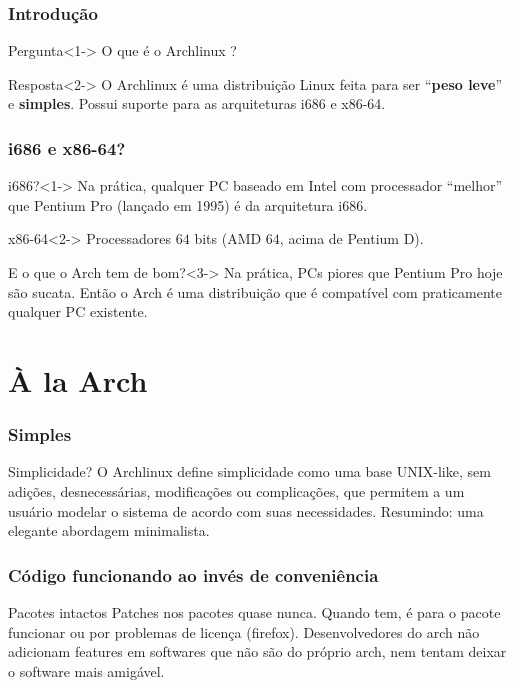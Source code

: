 \documentclass{beamer}
\begin{document}

\begin{frame}
    \frametitle{Introdução}
    \begin{block}{Pergunta}<1->
        O que é o Archlinux ?
    \end{block}
    \begin{block}{Resposta}<2->
            O Archlinux é uma distribuição Linux feita para ser ``\textbf{peso leve}'' e \textbf{simples}. Possui suporte para as arquiteturas i686 e x86-64. 
    \end{block}
    
\end{frame}

\begin{frame}
    \frametitle{i686 e x86-64?}
    \begin{block}{i686?}<1->
        Na prática, qualquer PC baseado em Intel com processador ``melhor'' que Pentium Pro (lançado em 1995) é da arquitetura i686. 
    \end{block}
    \begin{block}{x86-64}<2->
        Processadores $64$ bits (AMD $64$, acima de Pentium D). 
    \end{block}
    \begin{block}{E o que o Arch tem de bom?}<3->
        Na prática, PCs piores que Pentium Pro hoje são sucata. Então o Arch é uma distribuição que é compatível com praticamente qualquer PC existente.
    \end{block}

\end{frame}

\section{À la Arch}

\begin{frame}
    \frametitle{Simples}
    \begin{block}{Simplicidade?}
        O Archlinux define simplicidade como uma base UNIX-like, sem adições,
        desnecessárias, modificações ou complicações, que permitem a um usuário modelar o sistema de acordo com suas 
        necessidades. Resumindo: uma elegante abordagem minimalista.
    \end{block}
\end{frame}


\begin{frame}
    \frametitle{Código funcionando ao invés de conveniência} 
    \begin{block}{Pacotes intactos}
        Patches nos pacotes quase nunca. Quando tem, é para o pacote funcionar ou por problemas de licença (firefox). Desenvolvedores do 
        arch não adicionam features em softwares que não são do próprio arch, nem tentam deixar o software mais amigável.
    \end{block}
\end{frame}
\end{document}
